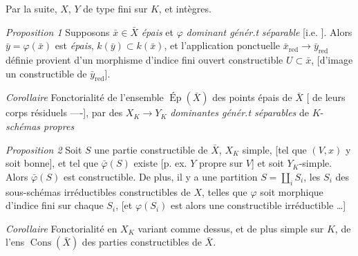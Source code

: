 \documentclass[11pt,a4paper]{article}
\begin{document}
Par la suite, $X$, $Y$ de type fini sur $K$, et  intègres.

\emph{Proposition 1} Supposons $\bar{x} \in \bar{X}$ \emph{épais} et $\varphi$ \emph{dominant génér.t} \emph{séparable} [i.e. \ill{}  ]. Alors  $\bar{y} = \varphi(\bar{x})$  est \emph{épais}, $k(\bar{y}) \subset k(\bar{x})$, et l'application ponctuelle $\bar{x}_{\mathrm{red}} \to \bar{y}_{\mathrm{red}}$ définie  provient d'un morphisme d'indice fini  \struck{\ill{}} ouvert constructible  $U \subset \bar{x}$, [d'image un \struck{\ill{}} constructible de $\bar{y}_{\mathrm{red}}$].

\emph{Corollaire} Fonctorialité  de l'ensemble $\operatorname{Ép}(\bar{X})$ des points \struck{\ill{}} épais de $\bar{X}$ [\ill{} \ill{} \ill{} de leurs corps résiduels ----], par des   $X_K \to Y_K$ \emph{dominantes génér.t séparables} de $K$-\emph{schémas propres}

\emph{Proposition 2} Soit $S$ une partie constructible de $\bar{X}$, $X_K$ simple, [tel que $(V, x)$ y soit bonne], et tel que $\bar{\varphi}(S)$ existe [p. ex. $Y$ propre sur $V$] et soit $Y_K$-simple. Alors $\bar{\varphi}(S)$ est constructible. De plus, il y a une partition  $S = \coprod_i S_i$, les $S_i$ des sous-schémas irréductibles constructibles de $X$, telles que $\varphi$ soit morphique d'indice fini sur chaque $S_i$, [et $\varphi(S_i)$ est alors une  constructible irréductible \ldots]

\emph{Corollaire} Fonctorialité  en $X_K$ variant comme dessus, et de plus simple sur $K$, de l'ens $\operatorname{Cons}(\bar{X})$ des parties constructibles de $\bar{X}$.
\end{document}
